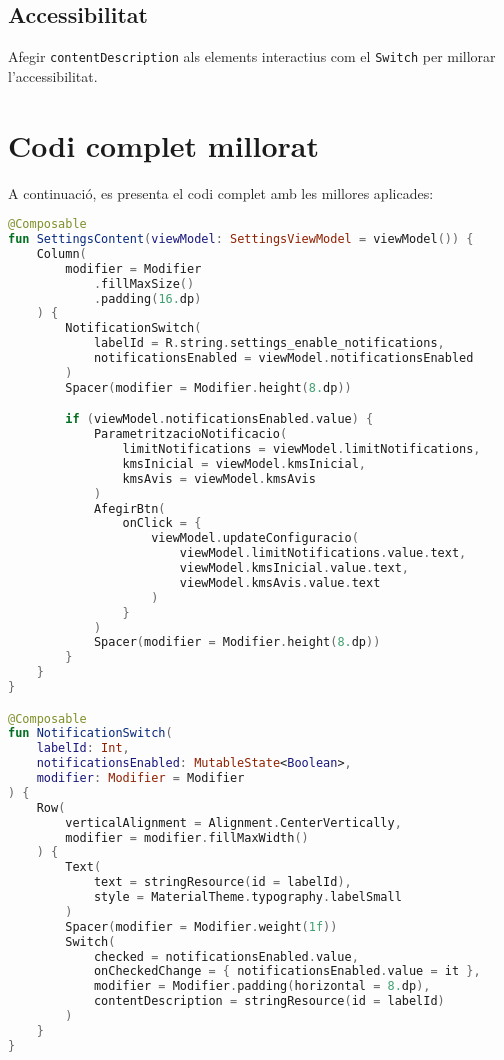 \documentclass[a4paper,12pt]{article}
\begin{document}
\subsection{Accessibilitat}
Afegir \texttt{contentDescription} als elements interactius com el \texttt{Switch} per millorar l'accessibilitat.

\section{Codi complet millorat}

A continuació, es presenta el codi complet amb les millores aplicades:

\begin{lstlisting}[language=Kotlin]
@Composable
fun SettingsContent(viewModel: SettingsViewModel = viewModel()) {
    Column(
        modifier = Modifier
            .fillMaxSize()
            .padding(16.dp)
    ) {
        NotificationSwitch(
            labelId = R.string.settings_enable_notifications,
            notificationsEnabled = viewModel.notificationsEnabled
        )
        Spacer(modifier = Modifier.height(8.dp))

        if (viewModel.notificationsEnabled.value) {
            ParametritzacioNotificacio(
                limitNotifications = viewModel.limitNotifications,
                kmsInicial = viewModel.kmsInicial,
                kmsAvis = viewModel.kmsAvis
            )
            AfegirBtn(
                onClick = {
                    viewModel.updateConfiguracio(
                        viewModel.limitNotifications.value.text,
                        viewModel.kmsInicial.value.text,
                        viewModel.kmsAvis.value.text
                    )
                }
            )
            Spacer(modifier = Modifier.height(8.dp))
        }
    }
}

@Composable
fun NotificationSwitch(
    labelId: Int,
    notificationsEnabled: MutableState<Boolean>,
    modifier: Modifier = Modifier
) {
    Row(
        verticalAlignment = Alignment.CenterVertically,
        modifier = modifier.fillMaxWidth()
    ) {
        Text(
            text = stringResource(id = labelId),
            style = MaterialTheme.typography.labelSmall
        )
        Spacer(modifier = Modifier.weight(1f))
        Switch(
            checked = notificationsEnabled.value,
            onCheckedChange = { notificationsEnabled.value = it },
            modifier = Modifier.padding(horizontal = 8.dp),
            contentDescription = stringResource(id = labelId)
        )
    }
}


\end{lstlisting}
\end{document}
